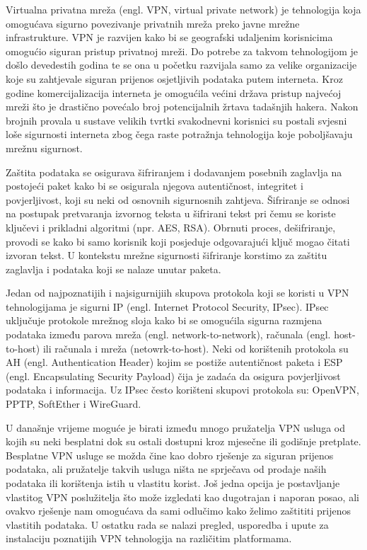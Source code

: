 
	Virtualna privatna mreža (engl. VPN, virtual private network) je tehnologija koja omogućava sigurno povezivanje privatnih mreža preko javne mrežne infrastrukture. VPN je razvijen kako bi se geografski udaljenim korisnicima omogućio siguran pristup privatnoj mreži.\cite{cis} Do potrebe za takvom tehnologijom je došlo devedestih godina te se ona u početku razvijala samo za velike organizacije koje su zahtjevale siguran prijenos osjetljivih podataka putem interneta. Kroz godine komercijalizacija interneta je omogućila većini država pristup najvećoj mreži što je drastično povećalo broj potencijalnih žrtava tadašnjih hakera. Nakon brojnih provala u sustave velikih tvrtki svakodnevni korisnici su postali svjesni loše sigurnosti interneta zbog čega raste potražnja tehnologija koje poboljšavaju mrežnu sigurnost.
 \bigbreak
	
Zaštita podataka se osigurava šifriranjem i dodavanjem posebnih zaglavlja na postojeći paket kako bi se osigurala njegova  autentičnost, integritet i povjerljivost, koji su neki od osnovnih sigurnosnih zahtjeva. Šifriranje se odnosi na  postupak pretvaranja izvornog teksta u šifrirani tekst pri čemu se koriste ključevi i prikladni algoritmi (npr. AES, RSA). Obrnuti proces, dešifriranje, provodi se kako bi samo korisnik koji posjeduje odgovarajući ključ mogao čitati izvoran tekst. U kontekstu mrežne sigurnosti šifriranje korstimo za zaštitu zaglavlja i podataka koji se nalaze unutar paketa.\cite{fundamentals} 
\bigbreak

Jedan od najpoznatijih i najsigurnijiih skupova protokola koji se koristi u VPN tehnologijama je sigurni IP (engl. Internet Protocol Security, IPsec). IPsec uključuje protokole mrežnog sloja kako bi se omogućila sigurna razmjena podataka između parova mreža (engl. network-to-network), računala (engl. host-to-host) ili računala i mreža (netowrk-to-host). Neki od korištenih protokola su AH (engl. Authentication Header) kojim se postiže autentičnost paketa i ESP (engl. Encapsulating Security Payload) čija je zadaća da osigura povjerljivost podataka i informacija. Uz IPsec često korišteni skupovi protokola su: OpenVPN, PPTP, SoftEther i WireGuard. 
\bigbreak
 
U današnje vrijeme moguće je birati između mnogo pružatelja VPN usluga od kojih su neki besplatni dok su ostali dostupni kroz mjesečne ili godišnje pretplate. Besplatne VPN usluge se možda čine kao dobro rješenje za siguran prijenos podataka, ali pružatelje takvih usluga ništa ne sprječava od prodaje naših podataka ili korištenja istih u vlastitu korist. Još jedna opcija je postavljanje vlastitog VPN poslužitelja što može izgledati kao dugotrajan i naporan posao, ali ovakvo rješenje nam omogućava da sami odlučimo kako želimo zaštititi prijenos vlastitih podataka. U ostatku rada se nalazi pregled, usporedba i upute za instalaciju poznatijih VPN tehnologija na različitim platformama.

